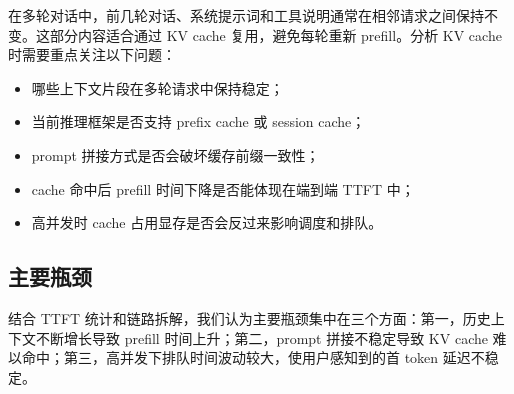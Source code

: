 在多轮对话中，前几轮对话、系统提示词和工具说明通常在相邻请求之间保持不变。这部分内容适合通过 KV cache 复用，避免每轮重新 prefill。分析 KV cache 时需要重点关注以下问题：

\begin{itemize}
  \item 哪些上下文片段在多轮请求中保持稳定；
  \item 当前推理框架是否支持 prefix cache 或 session cache；
  \item prompt 拼接方式是否会破坏缓存前缀一致性；
  \item cache 命中后 prefill 时间下降是否能体现在端到端 TTFT 中；
  \item 高并发时 cache 占用显存是否会反过来影响调度和排队。
\end{itemize}

\subsection{主要瓶颈}

结合 TTFT 统计和链路拆解，我们认为主要瓶颈集中在三个方面：第一，历史上下文不断增长导致 prefill 时间上升；第二，prompt 拼接不稳定导致 KV cache 难以命中；第三，高并发下排队时间波动较大，使用户感知到的首 token 延迟不稳定。
